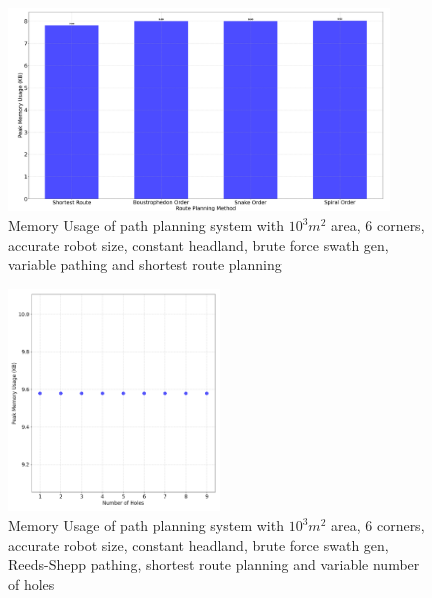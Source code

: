 \documentclass[final]{cmpreport_02}
\begin{document}
\begin{figure}[h!]
	\centering
	\includegraphics[width=0.9\textwidth]{./images/pathingRoutePlanningMem.png}
	\caption{Memory Usage of path planning system with $10^3m^2$ area, 6 corners, accurate robot size, constant headland, brute force swath gen, variable pathing and shortest route planning}
	\label{PE:p:RoutePlanningMem}
\end{figure}


\begin{figure}[h!]
	\centering
	\includegraphics[width=0.5\textwidth]{./images/pathingHolesMem.png}
	\caption{Memory Usage of path planning system with $10^3m^2$ area, 6 corners, accurate robot size, constant headland, brute force swath gen, Reeds-Shepp pathing, shortest route planning and variable number of holes}
	\label{PE:p:HolesMem}
\end{figure}


\clearpage
\end{document}
